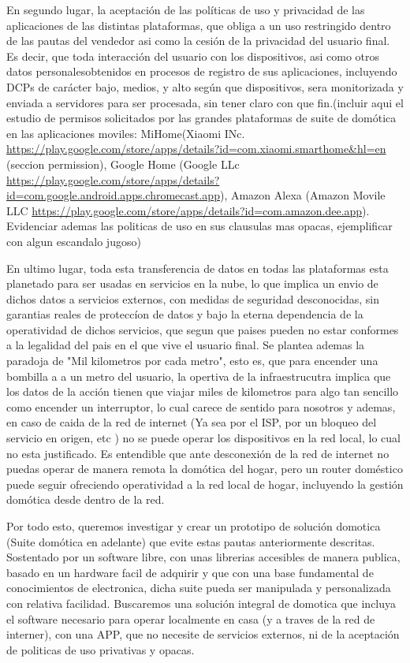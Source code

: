 En segundo lugar, la aceptación de las políticas de uso y privacidad de las aplicaciones de las distintas plataformas, que obliga a un uso restringido dentro de las pautas del vendedor asi como la cesión de la privacidad del usuario final. Es decir, que toda interacción del usuario con los dispositivos, asi como otros datos personalesobtenidos en procesos de registro de sus aplicaciones, incluyendo DCPs de carácter bajo, medios, y alto según que dispositivos, sera monitorizada y enviada a servidores para ser procesada, sin tener claro con que fin.(incluir aqui el estudio de permisos solicitados por las grandes plataformas de suite de domótica en las aplicaciones moviles: MiHome(Xiaomi INc. \url{https://play.google.com/store/apps/details?id=com.xiaomi.smarthome&hl=en} (seccion permission), Google Home (Google LLc \url{https://play.google.com/store/apps/details?id=com.google.android.apps.chromecast.app}), Amazon Alexa (Amazon Movile LLC \url{https://play.google.com/store/apps/details?id=com.amazon.dee.app}). Evidenciar ademas las politicas de uso en sus clausulas mas opacas, ejemplificar con algun escandalo jugoso)

En ultimo lugar, toda esta transferencia de datos en todas las plataformas esta planetado para ser usadas en servicios en la nube, lo que implica un envio de dichos datos a servicios externos, con medidas de seguridad desconocidas, sin garantias reales de proteccíon de datos y bajo la eterna dependencia de la operatividad de dichos servicios, que segun que paises pueden no estar conformes a la legalidad del pais en el que vive el usuario final. Se plantea ademas la paradoja de "Mil kilometros por cada metro", esto es, que para encender una bombilla a a un metro del usuario, la opertiva de la infraestrucutra implica que los datos de la acción tienen que viajar miles de kilometros para algo tan sencillo como encender un interruptor, lo cual carece de sentido para nosotros y ademas, en caso de caida de la red de internet (Ya sea por el ISP, por un bloqueo del servicio en origen, etc ) no se puede operar los dispositivos en la red local, lo cual no esta justificado. Es entendible que ante desconexión de la red de internet no puedas operar de manera remota la domótica del hogar, pero un router doméstico puede seguir ofreciendo operatividad a la red local de hogar, incluyendo la gestión domótica desde dentro de la red.

Por todo esto, queremos investigar y crear un prototipo de solución domotica (Suite domótica en adelante) que evite estas pautas anteriormente descritas. Sostentado por un software libre, con unas librerias accesibles de manera publica, basado en un hardware facil de adquirir y que con una base fundamental de conocimientos de electronica, dicha suite pueda ser manipulada y personalizada con relativa facilidad. Buscaremos una solución integral de domotica que incluya el software necesario para operar localmente en casa (y a traves de la red de interner), con una APP, que no necesite de servicios externos, ni de la aceptación de politicas de uso privativas y opacas.

